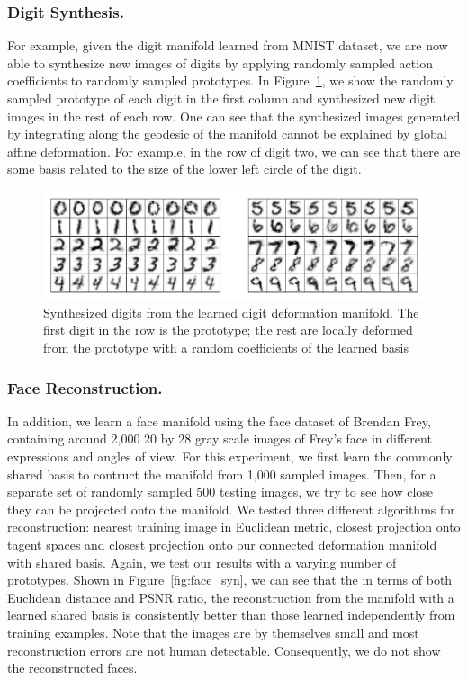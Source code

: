 \subsubsection{Digit Synthesis.}
%
For example, given the digit manifold learned from MNIST dataset, we are now able
to synthesize new images of digits by applying randomly sampled action
coefficients to randomly sampled prototypes.  In
Figure~\ref{fig:char_syn}, we show the randomly sampled prototype of
each digit in the first column and synthesized new digit images in the
rest of each row. One can see that the synthesized images
generated by integrating along the geodesic of the manifold cannot be
explained by global affine deformation. For example, in the row of digit two, we
can see that there are some basis related to the size of the lower
left circle of the digit.
\begin{figure}[t]
    \centering
    \includegraphics[height=0.28\columnwidth]{figs/digit_table.pdf}
    \caption{Synthesized digits from the learned digit deformation manifold. 
The first digit in the row is the prototype; 
the rest are locally deformed from the prototype with a random coefficients of the learned basis}
    \label{fig:char_syn}
\end{figure}

\subsubsection{Face Reconstruction.}
%
In addition, we learn a face manifold using
the face dataset of Brendan Frey, containing around
2,000 20 by 28 gray scale images of Frey's face in different
expressions and angles of view.  For this experiment, we first learn
the commonly shared basis to contruct the manifold from 1,000 sampled
images.  Then, for a separate set of randomly sampled 500 testing images,
we try to see how close they can be projected onto the manifold.  We
tested three different algorithms for reconstruction: nearest training
image in Euclidean metric, closest projection onto tagent spaces and
closest projection onto our connected deformation manifold with shared
basis.  Again, we test our results with a varying number of
prototypes. Shown in Figure~\ref{fig:face_syn}, we can see that the in
terms of both Euclidean distance and PSNR ratio, the reconstruction
from the manifold with a learned shared basis is consistently better than
those learned independently from training examples. Note that the images
are by themselves small and most reconstruction errors are not human
detectable. Consequently, we do not show the reconstructed faces.

